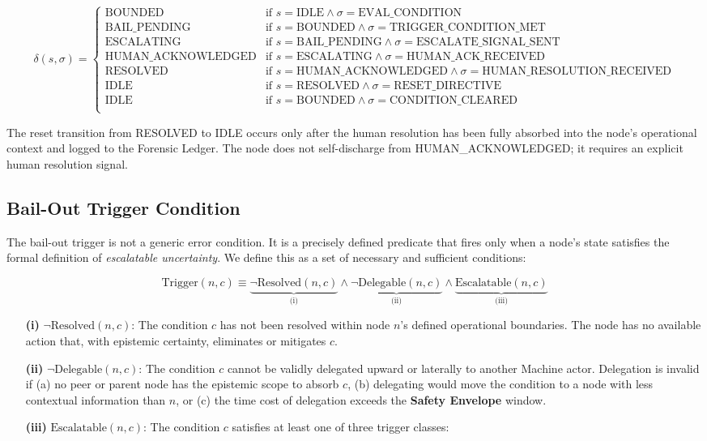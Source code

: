 \[
\delta(s, \sigma) = 
\begin{cases}
\text{BOUNDED} & \text{if } s = \text{IDLE} \land \sigma = \text{EVAL\_CONDITION} \\[6pt]
\text{BAIL\_PENDING} & \text{if } s = \text{BOUNDED} \land \sigma = \text{TRIGGER\_CONDITION\_MET} \\[6pt]
\text{ESCALATING} & \text{if } s = \text{BAIL\_PENDING} \land \sigma = \text{ESCALATE\_SIGNAL\_SENT} \\[6pt]
\text{HUMAN\_ACKNOWLEDGED} & \text{if } s = \text{ESCALATING} \land \sigma = \text{HUMAN\_ACK\_RECEIVED} \\[6pt]
\text{RESOLVED} & \text{if } s = \text{HUMAN\_ACKNOWLEDGED} \land \sigma = \text{HUMAN\_RESOLUTION\_RECEIVED} \\[6pt]
\text{IDLE} & \text{if } s = \text{RESOLVED} \land \sigma = \text{RESET\_DIRECTIVE} \\[6pt]
\text{IDLE} & \text{if } s = \text{BOUNDED} \land \sigma = \text{CONDITION\_CLEARED} \\
\end{cases}
\]

The reset transition from RESOLVED to IDLE occurs only after the human resolution has been fully absorbed into the node's operational context and logged to the Forensic Ledger. The node does not self-discharge from HUMAN\_ACKNOWLEDGED; it requires an explicit human resolution signal.

\subsection{Bail-Out Trigger Condition}

The bail-out trigger is not a generic error condition. It is a precisely defined predicate that fires only when a node's state satisfies the formal definition of \emph{escalatable uncertainty}. We define this as a set of necessary and sufficient conditions:

\[
\text{Trigger}(n, c) \equiv \underbrace{\neg \text{Resolved}(n, c)}_{\text{(i)}} \land \underbrace{\neg \text{Delegable}(n, c)}_{\text{(ii)}} \land \underbrace{\text{Escalatable}(n, c)}_{\text{(iii)}}
\]

\begin{itemize}
  \item[\textbf{(i)}] $\neg \text{Resolved}(n, c)$: The condition $c$ has not been resolved within node $n$'s defined operational boundaries. The node has no available action that, with epistemic certainty, eliminates or mitigates $c$.
  \item[\textbf{(ii)}] $\neg \text{Delegable}(n, c)$: The condition $c$ cannot be validly delegated upward or laterally to another Machine actor. Delegation is invalid if (a) no peer or parent node has the epistemic scope to absorb $c$, (b) delegating would move the condition to a node with less contextual information than $n$, or (c) the time cost of delegation exceeds the \textbf{Safety Envelope} window.
  \item[\textbf{(iii)}] $\text{Escalatable}(n, c)$: The condition $c$ satisfies at least one of three trigger classes:
\end{itemize}

